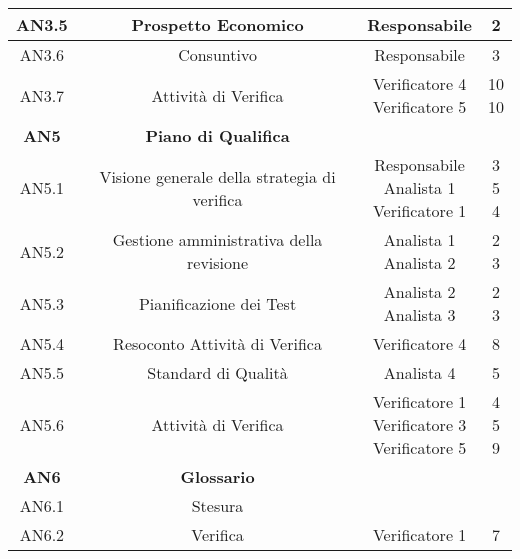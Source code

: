 \documentclass{scalatekids-article}
\begin{document}
\begin{center}
\begin{tabular}{| c | c | c | c |}
    AN3.5 & Prospetto Economico & Responsabile & 2\\
    \hline
    AN3.6 & Consuntivo & Responsabile & 3\\
    \hline
    AN3.7 & Attività di Verifica & \multiLineCell[t]{Verificatore 4\\Verificatore 5} & \multiLineCell[t]{10\\10}\\
    \hline
    \textbf{AN5} & \textbf{Piano di Qualifica} & &\\
    \hline
    AN5.1 & Visione generale della strategia di verifica & \multiLineCell[t]{Responsabile\\Analista 1\\Verificatore 1} & \multiLineCell[t]{3\\5\\4}\\
    \hline
    AN5.2 & Gestione amministrativa della revisione & \multiLineCell[t]{Analista 1\\Analista 2} & \multiLineCell[t]{2\\3}\\
    \hline
    AN5.3 & Pianificazione dei Test & \multiLineCell[t]{Analista 2\\Analista 3} & \multiLineCell[t]{2\\3}\\
    \hline
    AN5.4 & Resoconto Attività di Verifica & Verificatore 4 & 8\\
    \hline
    AN5.5 & Standard di Qualità & Analista 4 & 5\\
    \hline
    AN5.6 & Attività di Verifica & \multiLineCell[t]{Verificatore 1\\Verificatore 3\\Verificatore 5} & \multiLineCell[t]{4\\5\\9}\\
    \hline
    \textbf{AN6} & \textbf{Glossario} & &\\
    \hline
    AN6.1 & Stesura & &\\
    \hline
    AN6.2 & Verifica & Verificatore 1 & 7
  \end{tabular}
\end{center}
\normalsize

\newpage
\end{document}

